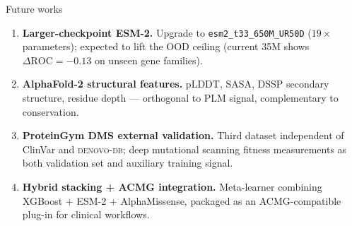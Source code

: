\documentclass[aspectratio=169,10pt]{beamer}
\begin{document}
\begin{frame}{Future works}
  \footnotesize
  \begin{enumerate}\setlength{\itemsep}{0.7em}
    \item \textbf{Larger-checkpoint ESM-2.}
          Upgrade to \texttt{esm2\_t33\_650M\_UR50D}
          ($19\times$ parameters); expected to lift the OOD
          ceiling (current 35M shows $\Delta\text{ROC} = -0.13$
          on unseen gene families).
    \item \textbf{AlphaFold-2 structural features.}
          pLDDT, SASA, DSSP secondary structure, residue depth ---
          orthogonal to PLM signal, complementary to conservation.
    \item \textbf{ProteinGym DMS external validation.}
          Third dataset independent of ClinVar and
          \textsc{denovo-db}; deep mutational scanning fitness
          measurements as both validation set and auxiliary
          training signal.
    \item \textbf{Hybrid stacking + ACMG integration.}
          Meta-learner combining XGBoost + ESM-2 + AlphaMissense,
          packaged as an ACMG-compatible plug-in for clinical
          workflows.
  \end{enumerate}
\end{frame}
\end{document}
